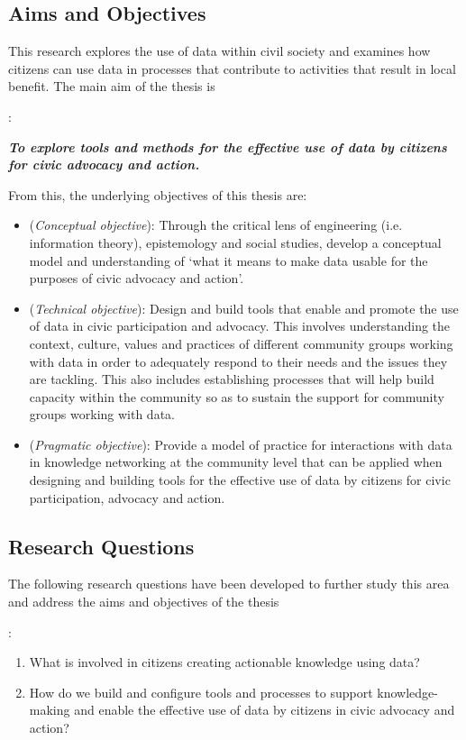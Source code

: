 \begin{introduction}
\section{Aims and Objectives}
\hypertarget{objectives}{This research explores the use of data within civil society and examines how citizens can use data in processes that contribute to activities that result in local benefit. The main aim of the thesis is}: 
\begin{center}
\textbf{\textit{To explore tools and methods for the effective use of data by citizens for civic advocacy and action.}}
\end{center}

From this, the underlying objectives of this thesis are:
\begin{itemize}
\item[i.] (\textit{Conceptual objective}): Through the critical lens of engineering (i.e. information theory), epistemology and social studies, develop a conceptual model and understanding of `what it means to make data usable for the purposes of civic advocacy and action'.

\item[ii.] (\textit{Technical objective}): Design and build tools that enable and promote the use of data in civic participation and advocacy. This involves understanding the context, culture, values and practices of different community groups working with data in order to adequately respond to their needs and the issues they are tackling. This also includes establishing processes that will help build capacity within the community so as to sustain the support for community groups working with data.

\item[iii.] (\textit{Pragmatic objective}): Provide a model of practice for interactions with data in knowledge networking at the community level that can be applied when designing and building tools for the effective use of data by citizens for civic participation, advocacy and action.
\end{itemize}

\subsection{Research Questions}
\hypertarget{questions}{The following research questions have been developed to further study this area and address the aims and objectives of the thesis}:
\begin{enumerate}
  \item What is involved in citizens creating actionable knowledge using data?
  \item How do we build and configure tools and processes to support knowledge-making and enable the effective use of data by citizens in civic advocacy and action?
\end{enumerate}


\end{introduction}
